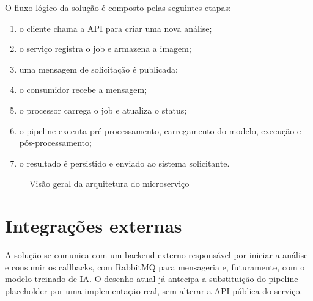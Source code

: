 O fluxo lógico da solução é composto pelas seguintes etapas:
\begin{enumerate}
    \item o cliente chama a API para criar uma nova análise;
    \item o serviço registra o job e armazena a imagem;
    \item uma mensagem de solicitação é publicada;
    \item o consumidor recebe a mensagem;
    \item o processor carrega o job e atualiza o status;
    \item o pipeline executa pré-processamento, carregamento do modelo, execução e pós-processamento;
    \item o resultado é persistido e enviado ao sistema solicitante.
\end{enumerate}

\begin{figure}[H]
    \centering
    \caption{Visão geral da arquitetura do microserviço}
    \label{fig:visao-geral-arquitetura}
\end{figure}

\section{Integrações externas}

A solução se comunica com um backend externo responsável por iniciar a análise e consumir os callbacks, com RabbitMQ para mensageria e, futuramente, com o modelo treinado de IA. O desenho atual já antecipa a substituição do pipeline placeholder por uma implementação real, sem alterar a API pública do serviço.
